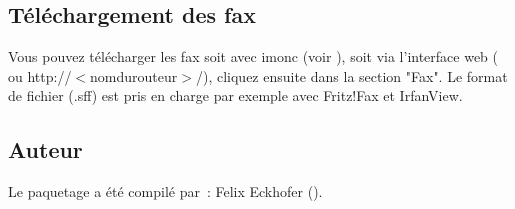 \subsection {Téléchargement des fax}

    Vous pouvez télécharger les fax soit avec imonc (voir ),
	soit via l'interface web ( ou http://$<$nomdurouteur$>$/),
	cliquez ensuite dans la section "Fax". Le format de fichier (.sff) est pris en
	charge par exemple avec Fritz!Fax et IrfanView.

\subsection {Auteur}

    Le paquetage a été compilé par~: Felix Eckhofer ().
